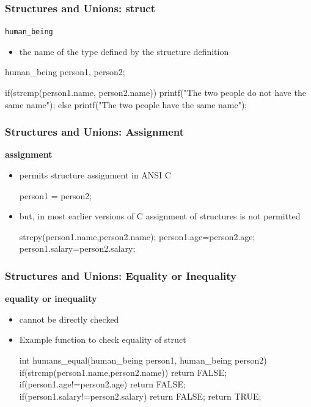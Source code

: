 \documentclass[newPxFont,sthlmFooter,nooffset]{beamer}
\begin{document}
\begin{frame}[t, fragile]
  \frametitle{Structures and Unions: struct}
\texttt{human\_being}  
\begin{itemize}
\item the name of the type defined by the structure definition
\end{itemize}

\begin{codedef}
human_being person1, person2;

if(strcmp(person1.name, person2.name)) 
    printf("The two people do not have the same name\n");
else
    printf("The two people have the same name\n");
\end{codedef}
\end{frame}


\begin{frame}[t, fragile]
  \frametitle{Structures and Unions: Assignment}
\textbf{assignment}
\begin{itemize}
\item permits structure assignment in ANSI C

\begin{codedef}
  person1 = person2;
\end{codedef}
\item but, in most earlier versions of C assignment of structures is not permitted
\begin{codedef}
   strcpy(person1.name,person2.name); 
   person1.age=person2.age; 
   person1.salary=person2.salary;    
\end{codedef}
\end{itemize}
\end{frame}


\begin{frame}[t, fragile]
  \frametitle{Structures and Unions: Equality or Inequality}
\textbf{equality or inequality}
\begin{itemize}
\item cannot be directly checked
\item Example function to check equality of struct
\begin{codedef}
int humans_equal(human_being person1, human_being person2) { 
    if(strcmp(person1.name,person2.name))
        return FALSE; 
    if(person1.age!=person2.age)
        return FALSE; 
    if(person1.salary!=person2.salary)
        return FALSE; 
    return TRUE;
}    
\end{codedef}
\end{itemize}

\end{frame}
\end{document}

